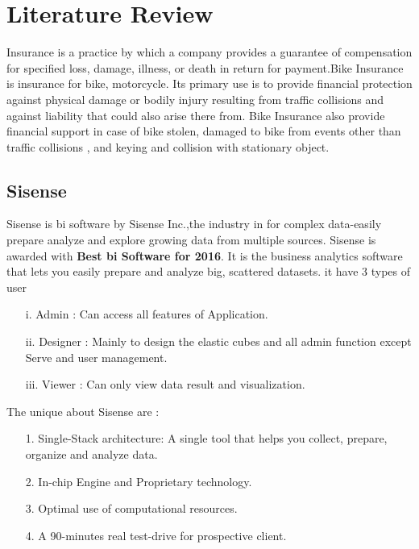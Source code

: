 \chapter{Literature Review}
Insurance is a practice by which a company provides a guarantee of compensation for specified loss, damage, illness, or death in return for payment.Bike Insurance is insurance for bike, motorcycle. Its primary use is to provide financial protection against physical damage or bodily injury resulting from traffic collisions and against liability that could also arise there from. Bike Insurance also provide financial support in case of bike stolen, damaged to bike from events other than traffic collisions , and keying and collision with stationary object. \cite{insurance2015bike}
\par
\section{Sisense}
 \par
Sisense is \acl{bi} software by Sisense Inc.,the  industry in for complex data-easily prepare analyze and explore growing  data from multiple sources. Sisense is awarded with \textbf{Best \acl{bi} Software for    2016}. It is the business analytics software that lets you easily
prepare and analyze big, scattered datasets. it have 3 types of user 
\begin{enumerate}
\item[i.] Admin : Can access all features of Application.
\item[ii.] Designer : Mainly to design the elastic cubes and all admin function except Serve and user management.
\item[iii.] Viewer : Can only view data result and visualization.
\end{enumerate}
\par The  unique about Sisense are :

\begin{enumerate}
\item[1.] Single-Stack architecture: A single tool that helps you collect, prepare, organize and analyze data.
\item[2.] In-chip Engine and Proprietary technology.
\item[3.] Optimal use of computational resources.
\item[4.] A 90-minutes real test-drive for prospective client.
\end{enumerate}
\par
